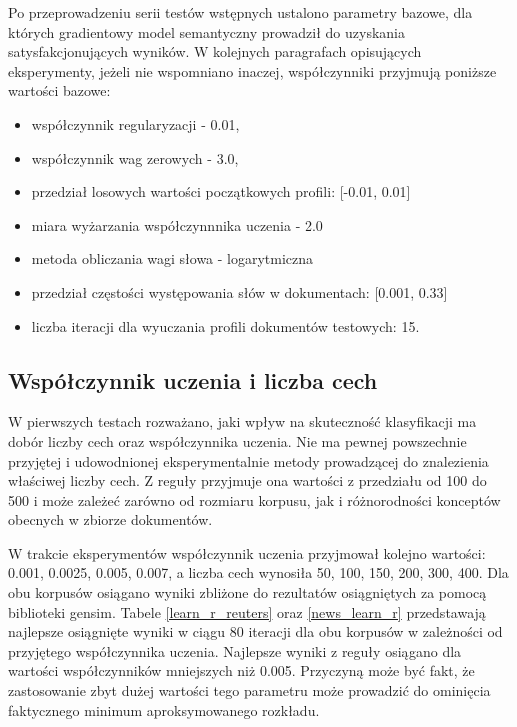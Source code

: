 \documentclass{pracamgr}
\begin{document}
Po przeprowadzeniu serii testów wstępnych ustalono parametry bazowe, dla których gradientowy model semantyczny prowadził do uzyskania satysfakcjonujących wyników. W kolejnych paragrafach opisujących eksperymenty, jeżeli nie wspomniano inaczej, współczynniki przyjmują poniższe wartości bazowe:

\begin{itemize}
    \item współczynnik regularyzacji - 0.01,
    \item współczynnik wag zerowych - 3.0,
    \item przedział losowych wartości początkowych profili: [-0.01, 0.01]
    \item miara wyżarzania współczynnnika uczenia - 2.0
    \item metoda obliczania wagi słowa - logarytmiczna
    \item przedział częstości występowania słów w dokumentach: [0.001, 0.33]
    \item liczba iteracji dla wyuczania profili dokumentów testowych: 15.
\end{itemize}

\subsection{Współczynnik uczenia i liczba cech}

W pierwszych testach rozważano, jaki wpływ na skuteczność klasyfikacji ma dobór liczby cech oraz współczynnika uczenia. Nie ma pewnej powszechnie przyjętej i udowodnionej eksperymentalnie metody prowadzącej do znalezienia właściwej liczby cech. Z reguły przyjmuje ona wartości z przedziału od 100 do 500 i może zależeć zarówno od rozmiaru korpusu, jak i różnorodności konceptów obecnych w zbiorze dokumentów.

W trakcie eksperymentów współczynnik uczenia przyjmował kolejno wartości: 0.001, 0.0025, 0.005, 0.007, a liczba cech wynosiła 50, 100, 150, 200, 300, 400. Dla obu korpusów osiągano wyniki zbliżone do rezultatów osiągniętych za pomocą biblioteki gensim. Tabele \ref{learn_r_reuters} oraz \ref{news_learn_r} przedstawają najlepsze osiągnięte wyniki w ciągu 80 iteracji dla obu korpusów w zależności od przyjętego współczynnika uczenia. Najlepsze wyniki z reguły osiągano dla wartości współczynników mniejszych niż 0.005. Przyczyną może być fakt, że zastosowanie zbyt dużej wartości tego parametru może prowadzić do ominięcia faktycznego minimum aproksymowanego rozkładu.
\end{document}
